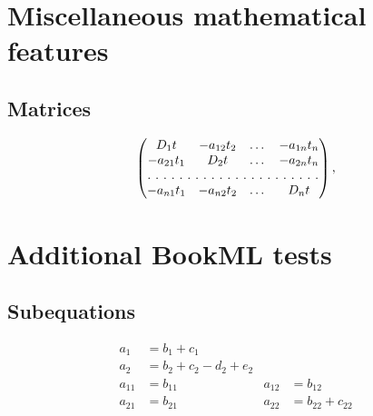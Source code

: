 \documentclass[oneside]{book}
\begin{document}
\chapter{Miscellaneous mathematical features}

\section{Matrices}

\begin{equation}\label{eq:D}
\begin{pmatrix} D_1t&-a_{12}t_2&\dots&-a_{1n}t_n\\
-a_{21}t_1&D_2t&\dots&-a_{2n}t_n\\
\hdotsfor[2]{4}\\
-a_{n1}t_1&-a_{n2}t_2&\dots&D_nt\end{pmatrix},
\end{equation}

\chapter{Additional BookML tests}

\section{Subequations}

\begin{subequations}
  \begin{align}
    a_1& =b_1+c_1\\
    a_2& =b_2+c_2-d_2+e_2\\
    a_{11}& =b_{11}&
      a_{12}& =b_{12}\\
    a_{21}& =b_{21}&
      a_{22}& =b_{22}+c_{22}
  \end{align}
\end{subequations}
\end{document}
